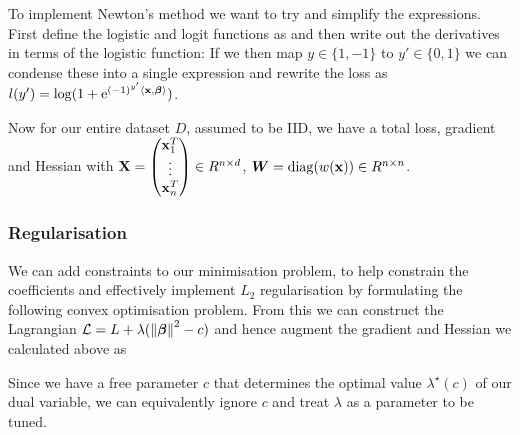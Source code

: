 \begin{appendices}
To implement Newton's method we want to try and simplify the expressions. First define the logistic and logit functions as
and then write out the derivatives in terms of the logistic function:
If we then map $y \in \{1,-1\}$ to $y' \in \{0,1\}$ we can condense these into a single expression
and rewrite the loss as $l(y') = \log(1+\mathrm{e}^{(-1)^{y'}\langle\mathbf{x},\bm{\beta}\rangle})$.

Now for our entire dataset $D$, assumed to be IID, we have a total loss, gradient and Hessian
with $\mathbf{X} = \begin{pmatrix} \mathbf{x}_1^T \\ \vdots \\ \mathbf{x}_n^T \end{pmatrix} \in R^{n\times d}$, $\bm{W} = \operatorname{diag}(w(\mathbf{x})) \in R^{n\times n}$.

\subsubsection{Regularisation}
We can add constraints to our minimisation problem, to help constrain the coefficients and effectively implement $L_2$ regularisation by formulating the following convex optimisation problem.
From this we can construct the Lagrangian $\mathcal{L} = L + \lambda(\left\lVert\bm{\beta}\right\rVert^2 - c)$ and hence augment the gradient and Hessian we calculated above as

Since we have a free parameter $c$ that determines the optimal value $\lambda^\star(c)$ of our dual variable, we can equivalently ignore $c$ and treat $\lambda$ as a parameter to be tuned.


\end{appendices}
